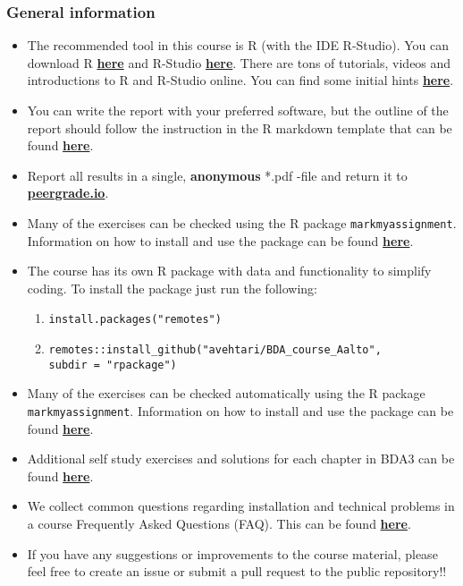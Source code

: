
\subsubsection*{General information}


\begin{itemize}
\itemsep0em 
\item The recommended tool in this course is R (with the IDE R-Studio). You can download R \href{https://cran.r-project.org/}{\textbf{here}} and R-Studio \href{https://www.rstudio.com/products/rstudio/download/}{\textbf{here}}. There are tons of tutorials, videos and introductions to R and R-Studio online. You can find some initial hints \href{https://www.rstudio.com/online-learning/}{\textbf{here}}. 
\item  You can write the report with your preferred software, but the outline of the report should follow the instruction in the R markdown template that can be found \href{https://raw.githubusercontent.com/avehtari/BDA_course_Aalto/master/templates/assignment_template.rmd}{\textbf{here}}. 
\item  Report all results in a single, {\bf anonymous} *.pdf -file and return it to \href{peergrade.io}{\textbf{peergrade.io}}. 
\item Many of the exercises can be checked using the R package \texttt{markmyassignment}. Information on how to install and use the package can be found \href{https://cran.r-project.org/web/packages/markmyassignment/vignettes/markmyassignment.html}{\textbf{here}}.
\item The course has its own R package with data and functionality to simplify coding. To install the package just run the following:
\begin{enumerate}
\item \texttt{install.packages("remotes")}
\item \texttt{remotes::install\_github("avehtari/BDA\_course\_Aalto", \\ subdir = "rpackage")}
\end{enumerate}
\item Many of the exercises can be checked automatically using the R package \\ \texttt{markmyassignment}. Information on how to install and use the package can be found \href{https://cran.r-project.org/web/packages/markmyassignment/vignettes/markmyassignment.html}{\textbf{here}}.
\item Additional self study exercises and solutions for each chapter in BDA3 can be found \href{http://www.stat.columbia.edu/~gelman/book/solutions3.pdf}{\textbf{here}}.
\item We collect common questions regarding installation and technical problems in a course Frequently Asked Questions (FAQ). This can be found \href{https://github.com/avehtari/BDA_course_Aalto/blob/master/FAQ.md}{\textbf{here}}.
\item If you have any suggestions or improvements to the course material, please feel free to create an issue or submit a pull request to the public repository!!
\end{itemize}